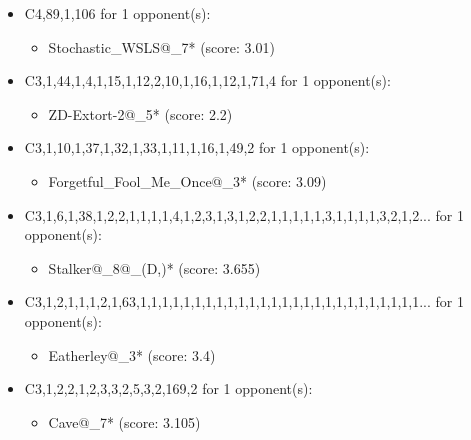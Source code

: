 \begin{appendices}
\begin{itemize}
    \item C4,89,1,106 for 1 opponent(s):
    \begin{multicols}{3}
         \begin{itemize}
            \item Stochastic\_WSLS@\_7* (score: 3.01)
        \end{itemize}
     \end{multicols}
     
    \item C3,1,44,1,4,1,15,1,12,2,10,1,16,1,12,1,71,4 for 1 opponent(s):
    \begin{multicols}{3}
         \begin{itemize}
            \item ZD-Extort-2@\_5* (score: 2.2)
        \end{itemize}
     \end{multicols}
     
    \item C3,1,10,1,37,1,32,1,33,1,11,1,16,1,49,2 for 1 opponent(s):
    \begin{multicols}{3}
         \begin{itemize}
            \item Forgetful\_Fool\_Me\_Once@\_3* (score: 3.09)
        \end{itemize}
     \end{multicols}
     
    \item C3,1,6,1,38,1,2,2,1,1,1,1,4,1,2,3,1,3,1,2,2,1,1,1,1,1,3,1,1,1,1,3,2,1,2... for 1 opponent(s):
    \begin{multicols}{3}
         \begin{itemize}
            \item Stalker@\_8@\_(D,)* (score: 3.655)
        \end{itemize}
     \end{multicols}
     
    \item C3,1,2,1,1,1,2,1,63,1,1,1,1,1,1,1,1,1,1,1,1,1,1,1,1,1,1,1,1,1,1,1,1,1,1... for 1 opponent(s):
    \begin{multicols}{3}
         \begin{itemize}
            \item Eatherley@\_3* (score: 3.4)
        \end{itemize}
     \end{multicols}
     
    \item C3,1,2,2,1,2,3,3,2,5,3,2,169,2 for 1 opponent(s):
    \begin{multicols}{3}
         \begin{itemize}
            \item Cave@\_7* (score: 3.105)
        \end{itemize}
     \end{multicols}
     

\end{itemize}
\end{appendices}
